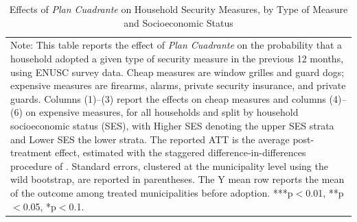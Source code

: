\begin{table}[h!]
\caption{Effects of \emph{Plan Cuadrante} on Household Security Measures, by Type of Measure and Socioeconomic Status}
\label{tab:hhprotectionmeasurestype}
\begin{center}
\par{
\begin{tabular}{p{\textwidth}}
\footnotesize{Note: This table reports the effect of \emph{Plan Cuadrante} on the probability that a household adopted a given type of security measure in the previous 12 months, using ENUSC survey data. Cheap measures are window grilles and guard dogs; expensive measures are firearms, alarms, private security insurance, and private guards. Columns (1)--(3) report the effects on cheap measures and columns (4)--(6) on expensive measures, for all households and split by household socioeconomic status (SES), with Higher SES denoting the upper SES strata and Lower SES the lower strata. The reported ATT is the average post-treatment effect, estimated with the staggered difference-in-differences procedure of \citet{Callaway}. Standard errors, clustered at the municipality level using the wild bootstrap, are reported in parentheses. The Y mean row reports the mean of the outcome among treated municipalities before adoption. ***p$<$0.01, **p$<$0.05, *p$<$0.1.} \\
\end{tabular}}
\end{center}
\end{table}
